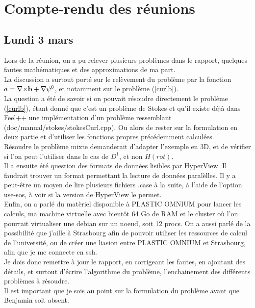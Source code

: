 \chapter{Compte-rendu des réunions}
\section{Lundi 3 mars}

Lors de la réunion, on a pu relever plusieurs problèmes dans le rapport, quelques fautes mathématiques et des approximations de ma part.\\

La discussion a surtout porté sur le relèvement du problème par la fonction $a={\nabla\times}\mathbf{b}+{\nabla}\psi^0$, et notamment sur le problème (\ref{curlb}).\\
La question a été de savoir si on pouvait résoudre directement le problème (\ref{curlb}), étant donné que c'est un problème de Stokes et qu'il existe déjà dans Feel++ une implémentation d'un problème ressemblant (doc/manual/stokes/stokesCurl.cpp). Ou alors de rester sur la formulation en deux partie et d'utiliser les fonctions propres précédemment calculées.\\
Résoudre le problème mixte demanderait d'adapter l'exemple en 3D, et de vérifier si l'on peut l'utiliser dans le cas de $D^1$, et non $H(rot)$.\\

Il a ensuite été question des formats de données lisibles par HyperView. Il faudrait trouver un format permettant la lecture de données paralèlles. Il y a peut-être un moyen de lire plusieurs fichiers .case à la suite, à l'aide de l'option use-sos, à voir si la version de HyperView le permet.\\

Enfin, on a parlé du matèriel disponible à PLASTIC OMNIUM pour lancer les calculs, ma machine virtuelle avec bientôt 64 Go de RAM et le cluster où l'on pourrait virtualiser une debian sur un noeud, soit 12 procs. On a aussi parlé de la possibilité que j'aille à Strasbourg afin de pouvoir utiliser les ressources de calcul de l'université, ou de créer une liasion entre PLASTIC OMNIUM et Strasbourg, afin que je me connecte en ssh.\\

Je dois donc remettre à jour le rapport, en corrigeant les fautes, en ajoutant des détails, et surtout d'écrire l'algorithme du problème, l'enchainement des différents problèmes à résoudre.\\
Il est important que je sois au point sur la formulation du problème avant que Benjamin soit absent.

